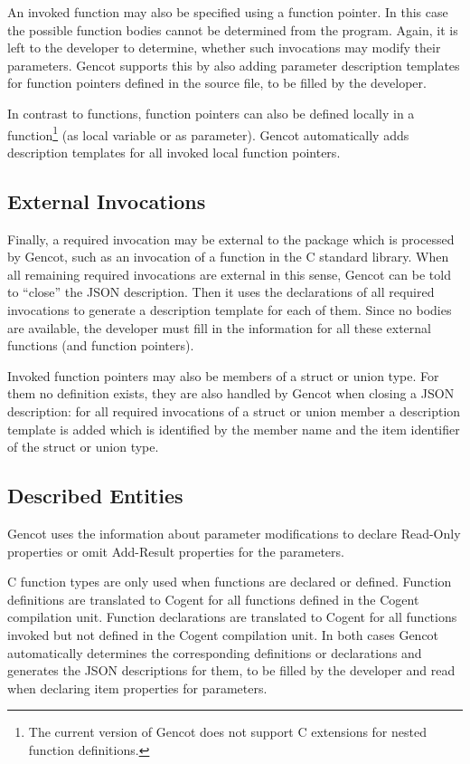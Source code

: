 An invoked function may also be specified using a function pointer. In this case the possible function bodies cannot 
be determined from the program. Again, it is left to the developer to determine, whether such invocations may modify
their parameters. Gencot supports this by also adding parameter description templates for function pointers defined in the 
source file, to be filled by the developer. 

In contrast to functions, function pointers can also be defined locally in a function\footnote{The current version of
Gencot does not support C extensions for nested function definitions.} (as local variable or as parameter). Gencot
automatically adds description templates for all invoked local function pointers.

\subsection{External Invocations}
\label{design-parmod-extern}

Finally, a required invocation may be external to the package which is processed by Gencot, such as an invocation of
a function in the C standard library. When all remaining required invocations are external in this sense, Gencot
can be told to ``close'' the JSON description. Then it uses the declarations of all required invocations to generate
a description template for each of them. Since no bodies are available, the developer must fill in the information
for all these external functions (and function pointers).

Invoked function pointers may also be members of a struct or union type. For them no definition exists, they are also 
handled by Gencot when closing a JSON description: for all required invocations of a struct or union member a 
description template is added which is identified by the member name and the item identifier of the struct or union type.
 
\subsection{Described Entities}
\label{design-parmod-entities}

Gencot uses the information about parameter modifications to declare Read-Only properties or omit Add-Result properties
for the parameters. 

C function types are only used when functions are declared or defined. Function definitions are translated to
Cogent for all functions defined in the Cogent compilation unit. Function declarations are translated to Cogent
for all functions invoked but not defined in the Cogent compilation unit. In both cases Gencot automatically 
determines the corresponding definitions or declarations and generates the JSON descriptions for them, to be
filled by the developer and read when declaring item properties for parameters.

